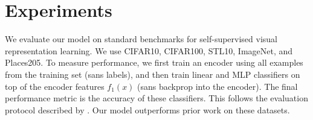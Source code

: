 \documentclass{article}
\begin{document}
\section{Experiments}
\label{sec:experiments}




We evaluate our model on standard benchmarks for self-supervised visual representation learning.
We use CIFAR10, CIFAR100, STL10, ImageNet, and Places205.
To measure performance, we first train an encoder using all examples from the training set (sans labels), and then train linear and MLP classifiers on top of the encoder features $f_1(x)$ (sans backprop into the encoder).
The final performance metric is the accuracy of these classifiers.
This follows the evaluation protocol described by \citet{Kolesnikov2019}.
Our model outperforms prior work on these datasets.
\end{document}
